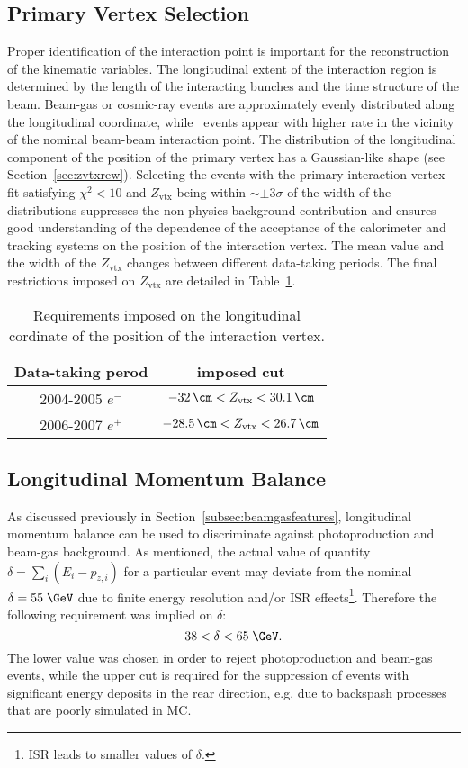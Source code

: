 \subsection{Primary Vertex Selection}
\label{subsec:vtxselect}
Proper identification of the interaction point is important for the reconstruction of the kinematic variables. The longitudinal extent of the interaction region is determined by the length of the interacting bunches and the time structure of the beam. Beam-gas or cosmic-ray events are approximately evenly distributed along the longitudinal coordinate, while \ep\, events appear with higher rate in the vicinity of the nominal beam-beam interaction point. The distribution of the longitudinal component of the position of the primary vertex has a Gaussian-like shape (see Section~\ref{sec:zvtxrew}). Selecting the events with the primary interaction vertex fit satisfying $\chi^2 < 10$ and $Z_\text{vtx}$ being within $\sim \pm 3\sigma$ of the width of the distributions suppresses the non-physics background contribution and ensures good understanding of the dependence of the acceptance of the calorimeter and tracking systems on the position of the interaction vertex. The mean value and the width of the $Z_\text{vtx}$ changes between different data-taking periods. The final restrictions imposed on $Z_\text{vtx}$ are detailed in Table~\ref{tab:zvxcut}.
\begin{table}[htbp]
	\centering
		\begin{tabular}{|c|c|}
			\hline
			Data-taking perod & imposed cut \\
			\hline
			\hline
			2004-2005 $e^{-}$ & $-32\,\cm<Z_\text{vtx}<30.1\,\cm$ \\
			2006-2007 $e^{+}$ & $-28.5\,\cm<Z_\text{vtx}<26.7\,\cm$ \\
			\hline
		\end{tabular}
	\caption{Requirements imposed on the longitudinal cordinate of the position of the interaction vertex.}
	\label{tab:zvxcut}
\end{table}

\subsection{Longitudinal Momentum Balance}
\label{subsec:empzcut}
As discussed previously in Section~\ref{subsec:beamgasfeatures}, longitudinal momentum balance can be used to discriminate against photoproduction and beam-gas background. As mentioned, the actual value of quantity $\delta=\sum_i{\left(E_i-p_{z,i}\right)}$ for a particular event may deviate from the nominal $\delta=55\;\GeV$ due to finite energy resolution and/or ISR effects\footnote{ISR leads to smaller values of $\delta$.}. Therefore the following requirement was implied on $\delta$:
\begin{equation}
38 < \delta < 65\;\GeV.
\label{eq:epmzcut}
\end{equation}
The lower value was chosen in order to reject photoproduction and beam-gas events, while the upper cut is required for the suppression of events with significant energy deposits in the rear direction, e.g. due to backspash processes that are poorly simulated in MC.

